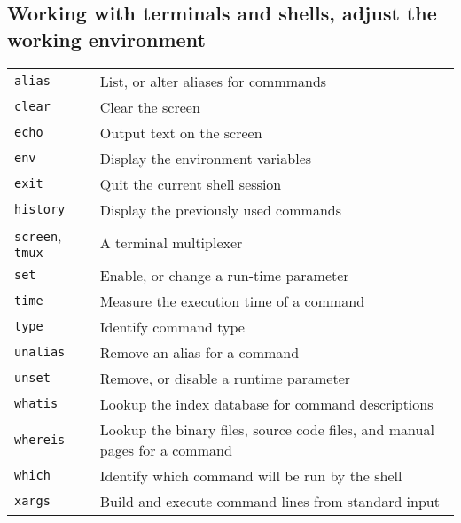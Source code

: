 \documentclass[10pt]{article}
\begin{document}
\begin{multicols}{2}
\section{Working with terminals and shells, adjust the working environment}
\begin{tabular}{ p{2.5cm} p{8.5cm} }
  \hline
  \texttt{alias} & List, or alter aliases for commmands \\
  \rowcolor{Gray}
  \texttt{clear} & Clear the screen \\
  \texttt{echo} & Output text on the screen \\
  \rowcolor{Gray}
  \texttt{env} & Display the environment variables \\
  \texttt{exit} & Quit the current shell session \\
  \rowcolor{Gray}
  \texttt{history} & Display the previously used commands \\
  \texttt{screen}, \texttt{tmux} & A terminal multiplexer \\
  \rowcolor{Gray}
  \texttt{set} & Enable, or change a run-time parameter \\
  \texttt{time} & Measure the execution time of a command \\
  \rowcolor{Gray}
  \texttt{type} & Identify command type \\
  \texttt{unalias} & Remove an alias for a command \\
  \rowcolor{Gray}
  \texttt{unset} & Remove, or disable a runtime parameter \\
  \texttt{whatis} & Lookup the index database for command descriptions \\
  \rowcolor{Gray}
  \texttt{whereis} & Lookup the binary files, source code files, and manual pages for a command \\
  \texttt{which} & Identify which command will be run by the shell\\
  \rowcolor{Gray}
  \texttt{xargs} & Build and execute command lines from standard input \\
  \hline
\end{tabular}

\columnbreak


\end{multicols}
\end{document}
